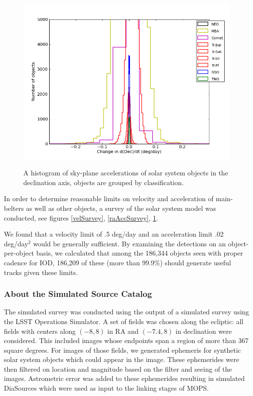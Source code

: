 \documentclass[12pt,preprint]{aastex}
\begin{document}
\begin{figure}[ht!]
  \centering
  \includegraphics[width=13cm]{illustrations/mopsplots/hist_accDec2.png}
  \label{decAccSurvey}
  \caption{A histogram of sky-plane accelerations of solar system
    objects in the declination axis, objects are grouped by
    classification.}
\end{figure}

In order to determine reasonable limits on velocity and acceleration
of main-belters as well as other objects, a survey of the solar system
model \citep{Grav2011} was conducted, see figures \ref{velSurvey},
\ref{raAccSurvey}, \ref{decAccSurvey}.  

We found that a velocity limit of .5 deg/day and an acceleration limit
.02 deg/day$^2$ would be generally sufficient.  By examining the
detections on an object-per-object basis, we calculated that among the
186,344 objects seen with proper cadence for IOD, 186,209 of these
(more than 99.9\%) should generate useful tracks given these limits.



\subsubsection{About the Simulated Source Catalog}
\label{sourceCatalog}
The simulated survey was conducted using the output of a simulated
survey using the LSST Operations Simulator.  A set of fields was
chosen along the ecliptic: all fields with centers along $(-8, 8)$ in
RA and $(-7.4, 8)$ in declination were considered.  This included
images whose endpoints span a region of more than 367 square
degrees. For images of those fields, we generated ephemeris for
synthetic solar system objects which could appear in the image.  These
ephemerides were then filtered on location and magnitude based on the
filter and seeing of the images.  Astrometric error was added to these
ephemerides resulting in simulated DiaSources which were used as input
to the linking stages of MOPS.
\end{document}
